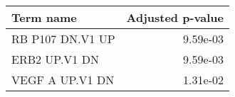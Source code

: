 \begin{tabular}{lr}
\toprule
       Term name &  Adjusted p-value \\
\midrule
RB P107 DN.V1 UP &          9.59e-03 \\
   ERB2 UP.V1 DN &          9.59e-03 \\
 VEGF A UP.V1 DN &          1.31e-02 \\
\bottomrule
\end{tabular}
